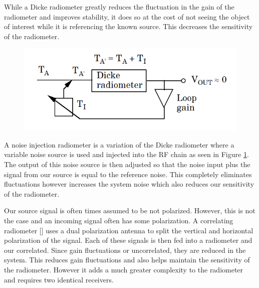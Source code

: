 While a Dicke radiometer greatly reduces the fluctuation in the gain of the radiometer and improves stability, it does so at the cost of not seeing the object of interest while it is referencing the known source.  This decreases the sensitivity of the radiometer.

{\begin{figure}[h!tb] 
\centering
\includegraphics[width=\textwidth]{Images/NoiseInj_block.png}
\label{NoiseInj_radiometer}
\end{figure}
}

A noise injection radiometer is a variation of the Dicke radiometer where a variable noise source is used and injected into the RF chain as seen in Figure \ref{NoiseInj_radiometer}.  The output of this noise source is then adjusted so that the noise input plus the signal from our source is equal to the reference noise.  This completely eliminates fluctuations however increases the system noise which also reduces our sensitivity of the radiometer.

Our source signal is often times assumed to be not polarized.  However, this is not the case and an incoming signal often has some polarization.  A correlating radiometer [\cite{Fujimoto}] uses a dual polarization antenna to split the vertical and horizontal polarization of the signal.  Each of these signals is then fed into a radiometer and our correlated.  Since gain fluctuations or uncorrelated, they are reduced in the system.  This reduces gain fluctuations and also helps maintain the sensitivity of the radiometer.  However it adds a much greater complexity to the radiometer and requires two identical receivers.  


